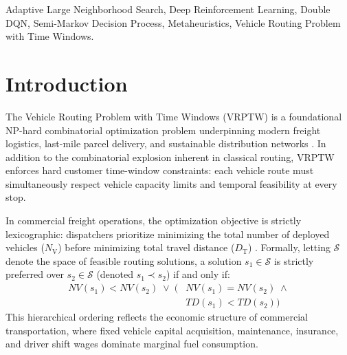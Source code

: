 \documentclass{ieeeaccess}
\newcommand{\NV}{{N_\mathrm{V}}}
\newcommand{\TD}{{D_\mathrm{T}}}
\begin{document}
\begin{keywords}
Adaptive Large Neighborhood Search, Deep Reinforcement Learning, Double DQN, Semi-Markov Decision Process, Metaheuristics, Vehicle Routing Problem with Time Windows.
\end{keywords}

\titlepgskip=-15pt

\maketitle

\titlepgskip=11pt

\section{Introduction}
\label{sec:introduction}

The Vehicle Routing Problem with Time Windows (VRPTW) is a foundational NP-hard combinatorial optimization problem underpinning modern freight logistics, last-mile parcel delivery, and sustainable distribution networks \cite{Dantzig1959, Solomon1987}. In addition to the combinatorial explosion inherent in classical routing, VRPTW enforces hard customer time-window constraints: each vehicle route must simultaneously respect vehicle capacity limits and temporal feasibility at every stop.

In commercial freight operations, the optimization objective is strictly lexicographic: dispatchers prioritize minimizing the total number of deployed vehicles ($\NV$) before minimizing total travel distance ($\TD$) \cite{Toth2014, braysy2005vehicle}. Formally, letting $\mathcal{S}$ denote the space of feasible routing solutions, a solution $s_1 \in \mathcal{S}$ is strictly preferred over $s_2 \in \mathcal{S}$ (denoted $s_1 \prec s_2$) if and only if:
\begin{equation}
  \begin{aligned}
    NV(s_1) < NV(s_2) \;\lor\; \big(&NV(s_1) = NV(s_2) \;\land \\
    &TD(s_1) < TD(s_2)\big)
  \end{aligned}
  \label{eq:lexicographic_intro}
\end{equation}
This hierarchical ordering reflects the economic structure of commercial transportation, where fixed vehicle capital acquisition, maintenance, insurance, and driver shift wages dominate marginal fuel consumption.
\end{document}

